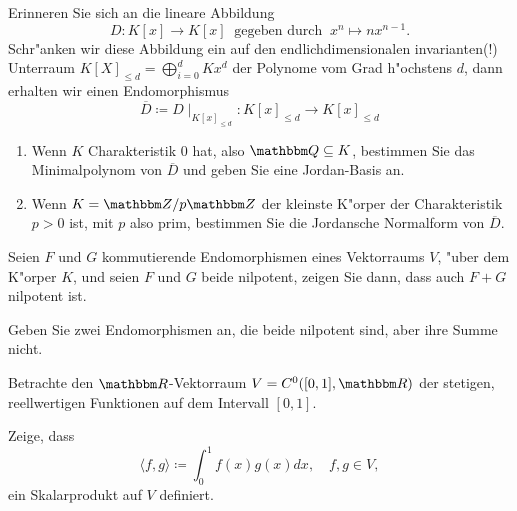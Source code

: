 \documentclass[a4,11pt]{article}
\begin{document}
\vspace*{-17mm}
{
\kopf
}


\begin{aufgabe}[4 Punkte]

Erinneren Sie sich an die lineare Abbildung
\[
D : K[x] \rightarrow K[x] \ \text{ gegeben durch } \ x^n \mapsto nx^{n-1}.
\]
Schr"anken wir diese Abbildung ein auf den endlichdimensionalen
invarianten(!) Unterraum $K[X]_{\leq d} = \bigoplus_{i = 0}^d Kx^d$
der Polynome vom Grad h"ochstens $d$, dann erhalten wir einen Endomorphismus
\[
\overline{D} \coloneqq D\mid_{K[x]_{\leq d}} : K[x]_{\leq d} \rightarrow K[x]_{\leq d}
\]
  
\begin{enumerate}
\item Wenn $K$ Charakteristik $0$ hat, also $\Q \subseteq K$,
  bestimmen Sie das Minimalpolynom von $\overline{D}$ und geben Sie
  eine Jordan-Basis an. %
\item Wenn $K = \Z/p\Z$ der kleinste K"orper der Charakteristik $p >
  0$ ist, mit $p$ also prim, bestimmen Sie die Jordansche Normalform
  von $\overline{D}$.
\end{enumerate}

\end{aufgabe}

\begin{aufgabe}[4 Punkte]

Seien $F$ und $G$ kommutierende Endomorphismen eines Vektorraums $V$,
"uber dem K"orper $K$, und seien $F$ und $G$ beide nilpotent, zeigen
Sie dann, dass auch $F+G$ nilpotent ist.

Geben Sie zwei Endomorphismen an, die beide nilpotent sind, aber ihre
Summe nicht.
\end{aufgabe}


\begin{aufgabe}[4 Punkte]
Betrachte den $\R$-Vektorraum $V=C^0([0,1],\R)$ der stetigen,
reellwertigen Funktionen auf dem Intervall $[0,1]$.

Zeige, dass
$$
\langle f,g \rangle \coloneqq \int_0^1 f(x)g(x) dx, \quad f,g \in V,
$$
ein Skalarprodukt auf $V$ definiert.

\end{aufgabe}
\end{document}
